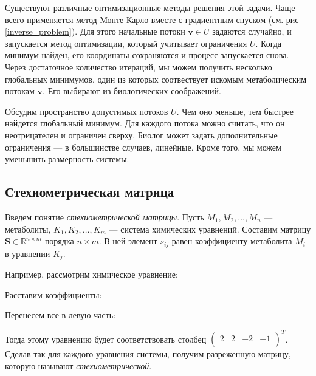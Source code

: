 \documentclass[14pt, a4paper]{extreport}
\begin{document}
Существуют различные оптимизационные методы решения этой задачи. Чаще всего применяется метод Монте-Карло вместе с градиентным спуском (см. рис \ref{inverse_problem}). Для этого начальные потоки $\mathbf{v} \in U$ задаются случайно, и запускается метод оптимизации, который учитывает ограничения $U$. Когда минимум найден, его координаты сохраняются и процесс запускается снова. Через достаточное количество итераций, мы можем получить несколько глобальных минимумов, один из которых соотвествует искомым метаболическим потокам $\mathbf{v}$. Его выбирают из биологических соображений.

Обсудим пространство допустимых потоков $U$. Чем оно меньше, тем быстрее найдется глобальный минимум. Для каждого потока можно считать, что он неотрицателен и ограничен сверху. Биолог может задать дополнительные ограничения --- в большинстве случаев, линейные. Кроме того, мы можем уменьшить размерность системы.

\subsection{Стехиометрическая матрица}

Введем понятие \emph{стехиометрической матрицы}. Пусть $M_1, M_2, \dots, M_n$ --- метаболиты, $K_1, K_2, \dots, K_m$ --- система химических уравнений. 
Составим матрицу $\mathbf{S} \in \mathbb{R}^{n \times m}$ порядка $n \times m$. В ней элемент $s_{ij}$ равен коэффициенту метаболита $M_i$ в уравнении $K_j$.

Например, рассмотрим химическое уравнение:

\begin{center}
\end{center}

Расставим коэффициенты:

\begin{center}
\end{center}

Перенесем все в левую часть:

\begin{center}
\end{center}
Тогда этому уравнению будет соответствовать столбец $\begin{pmatrix}
2 & 2 & -2 & -1\\
\end{pmatrix}^T$. Сделав так для каждого уравнения системы, получим разреженную матрицу, которую называют \emph{стехиометрической}.
\end{document}

